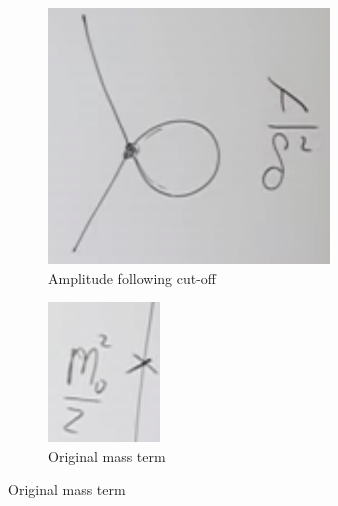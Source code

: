 \documentclass[]{article}
\begin{document}
\begin{figure}[H]
\begin{subfigure}[t]{0.3\textwidth}
	\end{subfigure}
	\begin{subfigure}[t]{0.3\textwidth}
		\caption{Amplitude following cut-off}\label{fig:3-1-cutoff}
		\includegraphics[width=\textwidth]{3-1-cutoff}
	\end{subfigure}
		\begin{subfigure}[t]{0.3\textwidth}
		\caption{Original mass term}\label{fig:3-1-original}
		\includegraphics[width=\textwidth]{3-1-original}
	\end{subfigure}
\end{figure}
\end{document}
